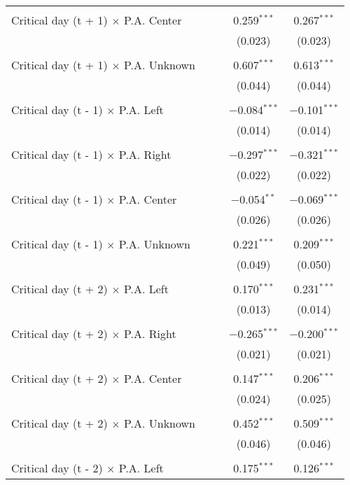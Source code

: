 \documentclass[
]{article}
\begin{document}
\begin{table}[!htbp]
{\begin{tabular}{@{\extracolsep{5pt}}lcccc}
  & & & & \\ 
 Critical day (t + 1) $\times$ P.A. Center &  &  & 0.259$^{***}$ & 0.267$^{***}$ \\ 
  &  &  & (0.023) & (0.023) \\ 
  & & & & \\ 
 Critical day (t + 1) $\times$ P.A. Unknown &  &  & 0.607$^{***}$ & 0.613$^{***}$ \\ 
  &  &  & (0.044) & (0.044) \\ 
  & & & & \\ 
 Critical day (t - 1) $\times$ P.A. Left &  &  & $-$0.084$^{***}$ & $-$0.101$^{***}$ \\ 
  &  &  & (0.014) & (0.014) \\ 
  & & & & \\ 
 Critical day (t - 1) $\times$ P.A. Right &  &  & $-$0.297$^{***}$ & $-$0.321$^{***}$ \\ 
  &  &  & (0.022) & (0.022) \\ 
  & & & & \\ 
 Critical day (t - 1) $\times$ P.A. Center &  &  & $-$0.054$^{**}$ & $-$0.069$^{***}$ \\ 
  &  &  & (0.026) & (0.026) \\ 
  & & & & \\ 
 Critical day (t - 1) $\times$ P.A. Unknown &  &  & 0.221$^{***}$ & 0.209$^{***}$ \\ 
  &  &  & (0.049) & (0.050) \\ 
  & & & & \\ 
 Critical day (t + 2) $\times$ P.A. Left &  &  & 0.170$^{***}$ & 0.231$^{***}$ \\ 
  &  &  & (0.013) & (0.014) \\ 
  & & & & \\ 
 Critical day (t + 2) $\times$ P.A. Right &  &  & $-$0.265$^{***}$ & $-$0.200$^{***}$ \\ 
  &  &  & (0.021) & (0.021) \\ 
  & & & & \\ 
 Critical day (t + 2) $\times$ P.A. Center &  &  & 0.147$^{***}$ & 0.206$^{***}$ \\ 
  &  &  & (0.024) & (0.025) \\ 
  & & & & \\ 
 Critical day (t + 2) $\times$ P.A. Unknown &  &  & 0.452$^{***}$ & 0.509$^{***}$ \\ 
  &  &  & (0.046) & (0.046) \\ 
  & & & & \\ 
 Critical day (t - 2) $\times$ P.A. Left &  &  & 0.175$^{***}$ & 0.126$^{***}$ \\ 

\end{tabular}}
\end{table}
\end{document}

